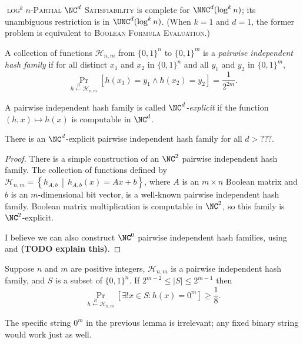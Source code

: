 \documentclass{article}
\newcommand{\existsu}{\exists !}
\newcommand{\random}{\overset{R}{\gets}}
\newcommand{\PSAT}{\textsc{$\log^k n$-Partial $\NC^d$ Satisfiability}}
\begin{document}
\PSAT{} is complete for $\NNC^d(\log^k n)$; its unambiguous restriction is in $\UNC^d(\log^k n)$.
(When $k = 1$ and $d = 1$, the former problem is equivalent to \textsc{Boolean Formula Evaluation}.)

\begin{definition}
  A collection of functions $\mathcal{H}_{n, m}$ from $\{0, 1\}^n$ to $\{0, 1\}^m$ is a \emph{pairwise independent hash family} if for all distinct $x_1$ and $x_2$ in $\{0, 1\}^n$ and all $y_1$ and $y_2$ in $\{0, 1\}^m$,
  \begin{equation*}
    \Pr_{h \random \mathcal{H}_{n, m}}\left[h(x_1) = y_1 \land h(x_2) = y_2\right] = \frac{1}{2^{2m}}.
  \end{equation*}

  A pairwise independent hash family is called \emph{$\NC^d$-explicit} if the function $(h, x) \mapsto h(x)$ is computable in $\NC^d$.
\end{definition}

\begin{lemma}\label{lem:hash}
  There is an $\NC^d$-explicit pairwise independent hash family for all $d > ???$.
\end{lemma}
\begin{proof}
  There is a simple construction of an $\NC^2$ pairwise independent hash family.
  The collection of functions defined by $\mathcal{H}_{n, m} = \left\{h_{A, b} \, \middle| \, h_{A, b}(x) = Ax + b \right\}$, where $A$ is an $m \times n$ Boolean matrix and $b$ is an $m$-dimensional bit vector, is a well-known pairwise independent hash family.
  Boolean matrix multiplication is computable in $\NC^2$, so this family is $\NC^2$-explicit.

  I believe we can also construct $\NC^0$ pairwise independent hash families, using \cite{ikos08} and \cite{spielman96} \textbf{(TODO explain this)}.
\end{proof}

\begin{lemma}\label{lem:vv}
  Suppose $n$ and $m$ are positive integers, $\mathcal{H}_{n, m}$ is a pairwise independent hash family, and $S$ is a subset of $\{0, 1\}^n$.
  If $2^{m - 2} \leq |S| \leq 2^{m - 1}$ then
  \begin{equation*}
    \Pr_{h \random \mathcal{H}_{n, m}}\left[\existsu x \in S \colon h(x) = 0^m \right] \geq \frac{1}{8}.
  \end{equation*}
\end{lemma}

The specific string $0^m$ in the previous lemma is irrelevant; any fixed binary string would work just as well.
\end{document}
